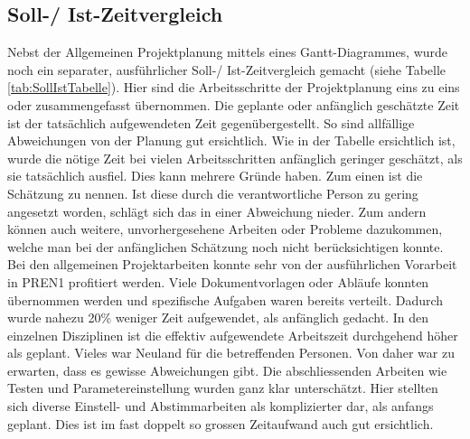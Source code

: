 \subsection{Soll-/ Ist-Zeitvergleich}
\label{sec:SollIstVergleich}
Nebst der Allgemeinen Projektplanung mittels eines Gantt-Diagrammes, wurde noch ein separater, 
ausführlicher Soll-/ Ist-Zeitvergleich gemacht (siehe Tabelle \ref{tab:SollIstTabelle}). Hier sind die Arbeitsschritte der
 Projektplanung eins zu eins oder zusammengefasst übernommen. Die geplante oder anfänglich geschätzte 
 Zeit ist der tatsächlich aufgewendeten Zeit gegenübergestellt. So sind allfällige Abweichungen von 
 der Planung gut ersichtlich. Wie in der Tabelle ersichtlich ist, wurde die nötige Zeit bei vielen Arbeitsschritten
  anfänglich geringer geschätzt, als sie tatsächlich ausfiel. Dies kann mehrere Gründe haben. 
  Zum einen ist die Schätzung zu nennen. Ist diese durch die verantwortliche Person zu gering angesetzt 
  worden, schlägt sich das in einer Abweichung nieder. Zum andern können auch weitere, unvorhergesehene 
  Arbeiten oder Probleme dazukommen, welche man bei der anfänglichen Schätzung noch nicht berücksichtigen konnte. 
  Bei den allgemeinen Projektarbeiten konnte sehr von der ausführlichen Vorarbeit in PREN1 profitiert werden. Viele Dokumentvorlagen oder 
  Abläufe konnten übernommen werden und spezifische Aufgaben waren bereits verteilt. Dadurch wurde nahezu 
  20\% weniger Zeit aufgewendet, als anfänglich gedacht. In den einzelnen Disziplinen ist die effektiv 
  aufgewendete Arbeitszeit durchgehend höher als geplant. Vieles war Neuland für die betreffenden Personen.
  Von daher war zu erwarten, dass es gewisse Abweichungen gibt. Die abschliessenden Arbeiten wie Testen und 
  Parametereinstellung wurden ganz klar unterschätzt. Hier stellten sich diverse Einstell- und Abstimmarbeiten 
  als komplizierter dar, als anfangs geplant. Dies ist im fast doppelt so grossen Zeitaufwand auch gut ersichtlich. 
  

